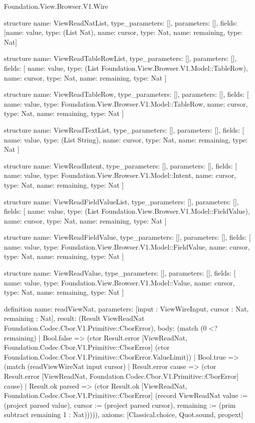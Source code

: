 \begin{lexlean}{Foundation.View.Browser.V1.Wire}
\begin{semanticmodule}
structure{
  name: ViewReadNatList,
  type_parameters: [],
  parameters: [],
  fields: [{name: value, type: (List Nat)}, {name: cursor, type: Nat}, {name: remaining, type: Nat}]
}

structure{
  name: ViewReadTableRowList,
  type_parameters: [],
  parameters: [],
  fields: [
    {name: value, type: (List Foundation.View.Browser.V1.Model::TableRow)},
    {name: cursor, type: Nat},
    {name: remaining, type: Nat}
  ]
}

structure{
  name: ViewReadTableRow,
  type_parameters: [],
  parameters: [],
  fields: [
    {name: value, type: Foundation.View.Browser.V1.Model::TableRow},
    {name: cursor, type: Nat},
    {name: remaining, type: Nat}
  ]
}

structure{
  name: ViewReadTextList,
  type_parameters: [],
  parameters: [],
  fields: [
    {name: value, type: (List String)},
    {name: cursor, type: Nat},
    {name: remaining, type: Nat}
  ]
}

structure{
  name: ViewReadIntent,
  type_parameters: [],
  parameters: [],
  fields: [
    {name: value, type: Foundation.View.Browser.V1.Model::Intent},
    {name: cursor, type: Nat},
    {name: remaining, type: Nat}
  ]
}

structure{
  name: ViewReadFieldValueList,
  type_parameters: [],
  parameters: [],
  fields: [
    {name: value, type: (List Foundation.View.Browser.V1.Model::FieldValue)},
    {name: cursor, type: Nat},
    {name: remaining, type: Nat}
  ]
}

structure{
  name: ViewReadFieldValue,
  type_parameters: [],
  parameters: [],
  fields: [
    {name: value, type: Foundation.View.Browser.V1.Model::FieldValue},
    {name: cursor, type: Nat},
    {name: remaining, type: Nat}
  ]
}

structure{
  name: ViewReadValue,
  type_parameters: [],
  parameters: [],
  fields: [
    {name: value, type: Foundation.View.Browser.V1.Model::Value},
    {name: cursor, type: Nat},
    {name: remaining, type: Nat}
  ]
}

definition{
  name: readViewNat,
  parameters: [input : ViewWireInput, cursor : Nat, remaining : Nat],
  result: (Result ViewReadNat Foundation.Codec.Cbor.V1.Primitive::CborError),
  body: (match (0 <? remaining)
    | Bool.false => (ctor Result.error [ViewReadNat, Foundation.Codec.Cbor.V1.Primitive::CborError] (ctor Foundation.Codec.Cbor.V1.Primitive::CborError.ValueLimit))
    | Bool.true => (match (readViewWireNat input cursor)
      | Result.error cause => (ctor Result.error [ViewReadNat, Foundation.Codec.Cbor.V1.Primitive::CborError] cause)
      | Result.ok parsed => (ctor Result.ok [ViewReadNat, Foundation.Codec.Cbor.V1.Primitive::CborError] (record ViewReadNat {value := (project parsed value), cursor := (project parsed cursor), remaining := (prim subtract remaining 1 : Nat)})))),
  axioms: [Classical.choice, Quot.sound, propext]
}


\end{semanticmodule}
\end{lexlean}
